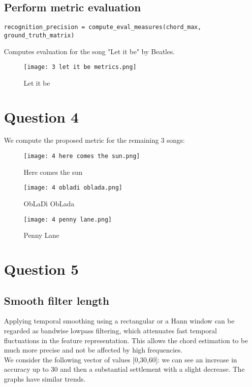 \documentclass{article}
\begin{document}
\subsection{Perform metric evaluation}
\begin{lstlisting}
recognition_precision = compute_eval_measures(chord_max, ground_truth_matrix)
\end{lstlisting}

Computes evaluation for the song "Let it be" by Beatles.\\

\begin{figure} [H]
 \centering
 \texttt{[image: 3 let it be metrics.png]}
 \caption{Let it be}
\end{figure}


\section{Question 4}
We compute the proposed metric for the remaining 3 songs:

\begin{figure} [H]
 \centering
 \texttt{[image: 4 here comes the sun.png]}
 \caption{Here comes the sun}
\end{figure}

\begin{figure} [H]
 \centering
 \texttt{[image: 4 obladi oblada.png]}
 \caption{ObLaDì ObLada}
\end{figure}

\begin{figure} [H]
 \centering
 \texttt{[image: 4 penny lane.png]}
 \caption{Penny Lane}
\end{figure}

\section{Question 5}
\subsection{Smooth filter length} 
Applying temporal smoothing using a rectangular or a Hann window can be regarded as bandwise lowpass filtering, which attenuates fast temporal fluctuations in the feature representation. This allows the chord estimation to be much more precise and not be affected by high frequencies. \\

We consider the following vector of values [0,30,60]: we can see an increase in accuracy up to 30 and then a substantial settlement with a slight decrease. The graphs have similar trends.\\
\end{document}
